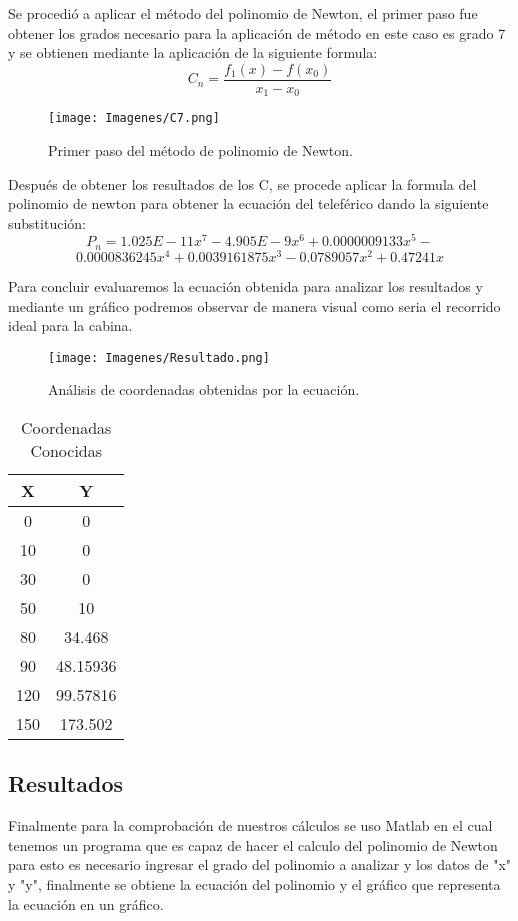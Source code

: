 \documentclass[fleqn,10pt]{olplainarticle}
\begin{document}
Se procedió a aplicar el método del polinomio de Newton, el primer paso fue obtener los grados necesario para la aplicación de método en este caso es grado 7 y se obtienen mediante la aplicación de la siguiente formula:  
\[ C_n=\frac{f_1(x) - f(x_0)}{x_1-x_0}\]

\begin{figure}[ht!]
\centering
\texttt{[image: Imagenes/C7.png]}
\caption{Primer paso del método de polinomio de Newton.}
\end{figure}

Después de obtener los resultados de los C, se procede aplicar la formula del polinomio de newton para obtener la ecuación del teleférico dando la siguiente substitución: 
\[ P_n=1.025E-11x^7-4.905E-9x^6+0.0000009133x^5-\]
\[ 0.0000836245x^4+0.0039161875x^3-0.0789057x^2+0.47241x\]

Para concluir evaluaremos la ecuación obtenida para analizar los resultados y mediante un gráfico podremos observar de manera visual como seria el recorrido ideal para la cabina.
\smallskip

\begin{figure}[h!]
\centering
\texttt{[image: Imagenes/Resultado.png]}
\caption{Análisis de coordenadas obtenidas por la ecuación.}
\end{figure}

\begin{table}[ht]
    \begin{center}
    \begin{tabular}{| c | c | }
    \hline
         X & Y \\ \hline
         0 & 0 \\
         10 & 0 \\
         30 & 0 \\
         50 & 10 \\
         80 & 34.468 \\
         90 & 48.15936 \\
         120 & 99.57816 \\
         150 & 173.502 \\ \hline
    \end{tabular}
    \caption{Coordenadas Conocidas}
    \end{center}
\end{table}


\subsection*{Resultados}
Finalmente para la comprobación de nuestros cálculos se uso Matlab en el cual tenemos un programa que es capaz de hacer el calculo del polinomio de Newton para esto es necesario ingresar el grado del polinomio a analizar y los datos de "x" y "y", finalmente se obtiene la ecuación del polinomio y el gráfico que representa la ecuación en un gráfico. 
\end{document}
